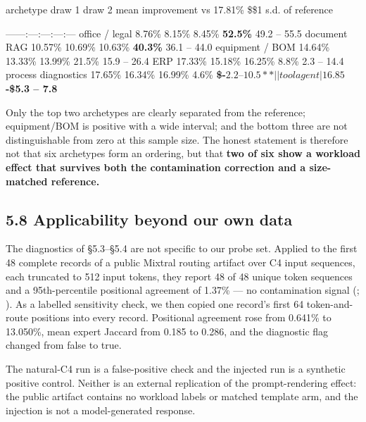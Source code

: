 \documentclass[
  10pt,
  letterpaper,
  10pt]{article}
\begin{document}
archetype \textbar{} draw 1 \textbar{} draw 2 \textbar{} mean \textbar{}
improvement vs 17.81\% \textbar{} \$\pm\$1 s.d. of reference \textbar{}

\textbar---\textbar---:\textbar---:\textbar---:\textbar---:\textbar---\textbar{}
\textbar{} office / legal \textbar{} 8.76\% \textbar{} 8.15\% \textbar{}
8.45\% \textbar{} \textbf{52.5\%} \textbar{} 49.2 -- 55.5 \textbar{}
\textbar{} document RAG \textbar{} 10.57\% \textbar{} 10.69\% \textbar{}
10.63\% \textbar{} \textbf{40.3\%} \textbar{} 36.1 -- 44.0 \textbar{}
\textbar{} equipment / BOM \textbar{} 14.64\% \textbar{} 13.33\%
\textbar{} 13.99\% \textbar{} 21.5\% \textbar{} 15.9 -- 26.4 \textbar{}
\textbar{} ERP \textbar{} 17.33\% \textbar{} 15.18\% \textbar{} 16.25\%
\textbar{} 8.8\% \textbar{} 2.3 -- 14.4 \textbar{} \textbar{} process
diagnostics \textbar{} 17.65\% \textbar{} 16.34\% \textbar{} 16.99\%
\textbar{} 4.6\% \textbar{} \textbf{\$-\(2.2 – 10.5** |
| tool agent | 16.85%
\)-\$5.3 -- 7.8} \textbar{}

Only the top two archetypes are clearly separated from the reference;
equipment/BOM is positive with a wide interval; and the bottom three are
not distinguishable from zero at this sample size. The honest statement
is therefore not that six archetypes form an ordering, but that
\textbf{two of six show a workload effect that survives both the
contamination correction and a size-matched reference.}

\subsection{5.8 Applicability beyond our own
data}\label{applicability-beyond-our-own-data}

The diagnostics of §5.3--§5.4 are not specific to our probe set. Applied
to the first 48 complete records of a public Mixtral routing artifact
over C4 input sequences, each truncated to 512 input tokens, they report
48 of 48 unique token sequences and a 95th-percentile positional
agreement of 1.37\% --- no contamination signal
(;
).
As a labelled sensitivity check, we then copied one record's first 64
token-and-route positions into every record. Positional agreement rose
from 0.641\% to 13.050\%, mean expert Jaccard from 0.185 to 0.286, and
the diagnostic flag changed from false to true.

The natural-C4 run is a false-positive check and the injected run is a
synthetic positive control. Neither is an external replication of the
prompt-rendering effect: the public artifact contains no workload labels
or matched template arm, and the injection is not a model-generated
response.
\end{document}
